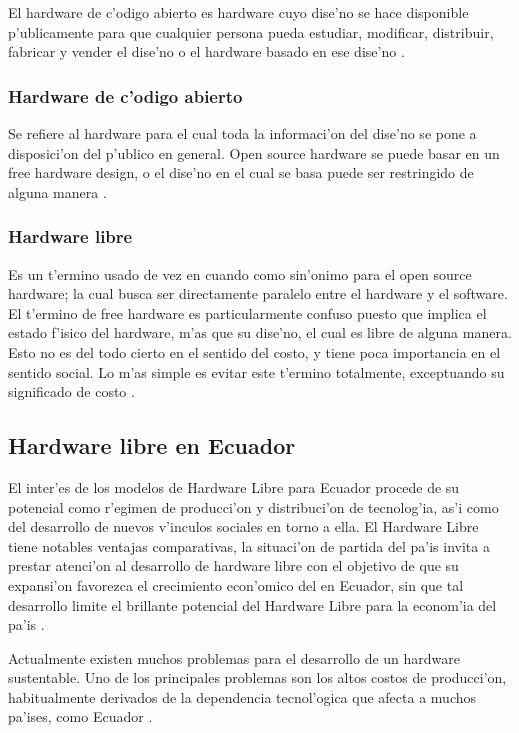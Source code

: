 El hardware de c'odigo abierto es hardware cuyo dise'no se hace disponible p'ublicamente para que cualquier persona pueda estudiar, modificar, distribuir, fabricar y vender el dise'no o el hardware basado en ese dise'no \citep{russell}.

\subsubsection{Hardware de c'odigo abierto}
Se refiere al hardware para el cual toda la informaci'on del dise'no se pone a
disposici'on del p'ublico en general. Open source hardware se puede basar en un
free hardware design, o el dise'no en el cual se basa puede ser restringido de
alguna manera  \citep{hernando}.

\subsubsection{Hardware libre}
Es un t'ermino usado de vez en cuando como sin'onimo para el open source
hardware; la cual busca ser directamente paralelo entre el hardware y el software. El t'ermino de
free hardware es particularmente confuso puesto que implica el estado f'isico del
hardware, m'as que su dise'no, el cual  es libre de alguna manera. Esto no es del
todo cierto en el sentido del costo, y tiene poca importancia en el sentido social.
Lo m'as simple es evitar este t'ermino totalmente, exceptuando su significado de
costo   \citep{hernando}.

\subsection{Hardware libre en Ecuador}
El inter'es de los modelos de Hardware Libre para Ecuador procede de su potencial como r'egimen de
producci'on y distribuci'on de tecnolog'ia, as'i como del desarrollo de nuevos
v'inculos sociales en torno a ella. El Hardware Libre tiene notables ventajas
comparativas, la situaci'on de partida del pa'is invita a prestar atenci'on al desarrollo de hardware libre con el objetivo de que su expansi'on favorezca el crecimiento econ'omico del en Ecuador, sin que tal desarrollo limite el
brillante potencial del Hardware Libre para la econom'ia del pa'is  \citep{lazalde}.


Actualmente existen muchos problemas para el desarrollo de un
hardware sustentable. Uno de los principales problemas son los altos costos de producci'on,
habitualmente derivados de la dependencia tecnol'ogica que afecta a muchos pa'ises, como
Ecuador \citep{lazalde}.

